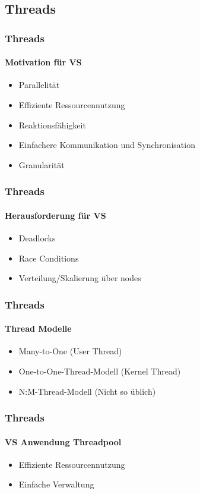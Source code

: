 \subsection{Threads}
\begin{frame}
  \frametitle{Threads}
  \framesubtitle{Motivation für VS}
  \begin{itemize}
    \item Parallelität
    \item Effiziente Ressourcennutzung
    \item Reaktionsfähigkeit
    \item Einfachere Kommunikation und Synchronisation 
    \item Granularität
  \end{itemize}
\end{frame}

\begin{frame}
  \frametitle{Threads}
  \framesubtitle{Herausforderung für VS}
  \begin{itemize}
    \item Deadlocks
    \item Race Conditions
    \item Verteilung/Skalierung über nodes
  \end{itemize}
\end{frame}

\begin{frame}
  \frametitle{Threads}
  \framesubtitle{Thread Modelle}
  \begin{itemize}
    \item Many-to-One (User Thread)
    \item One-to-One-Thread-Modell (Kernel Thread)
    \item N:M-Thread-Modell (Nicht so üblich)
  \end{itemize}
\end{frame}

\begin{frame}
  \frametitle{Threads}
  \framesubtitle{VS Anwendung Threadpool}
  \begin{itemize}
    \item Effiziente Ressourcennutzung
    \item Einfache Verwaltung
  \end{itemize}
\end{frame}

